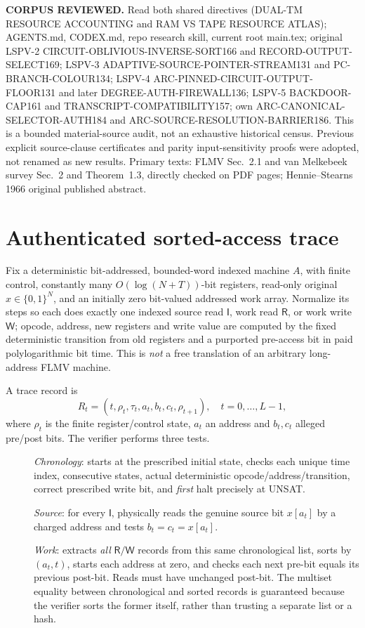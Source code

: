 \documentclass[11pt]{article}
\begin{document}
\noindent\textbf{CORPUS REVIEWED.} Read both shared directives (DUAL-TM RESOURCE ACCOUNTING and RAM VS TAPE RESOURCE ATLAS); AGENTS.md, CODEX.md, repo research skill, current root main.tex; original LSPV-2 CIRCUIT-OBLIVIOUS-INVERSE-SORT166 and RECORD-OUTPUT-SELECT169; LSPV-3 ADAPTIVE-SOURCE-POINTER-STREAM131 and PC-BRANCH-COLOUR134; LSPV-4 ARC-PINNED-CIRCUIT-OUTPUT-FLOOR131 and later DEGREE-AUTH-FIREWALL136; LSPV-5 BACKDOOR-CAP161 and TRANSCRIPT-COMPATIBILITY157; own ARC-CANONICAL-SELECTOR-AUTH184 and ARC-SOURCE-RESOLUTION-BARRIER186. This is a bounded material-source audit, not an exhaustive historical census. Previous explicit source-clause certificates and parity input-sensitivity proofs were adopted, not renamed as new results. Primary texts: FLMV Sec.~2.1 and van Melkebeek survey Sec.~2 and Theorem~1.3, directly checked on PDF pages; Hennie--Stearns 1966 original published abstract.

\section{Authenticated sorted-access trace}
Fix a deterministic bit-addressed, bounded-word indexed machine $A$, with finite control, constantly many $O(\log(N+T))$-bit registers, read-only original $x\in\{0,1\}^N$, and an initially zero bit-valued addressed work array. Normalize its steps so each does exactly one indexed source read $\mathsf I$, work read $\mathsf R$, or work write $\mathsf W$; opcode, address, new registers and write value are computed by the fixed deterministic transition from old registers and a purported pre-access bit in paid polylogarithmic bit time. This is \emph{not} a free translation of an arbitrary long-address FLMV machine.

A trace record is
\[
R_t=(t,\rho_t,\tau_t,a_t,b_t,c_t,\rho_{t+1}),\quad t=0,\ldots,L-1,
\]
where $\rho_t$ is the finite register/control state, $a_t$ an address and $b_t,c_t$ alleged pre/post bits. The verifier performs three tests.
\begin{description}
\item[] \emph{Chronology}: starts at the prescribed initial state, checks each unique time index, consecutive states, actual deterministic opcode/address/transition, correct prescribed write bit, and \emph{first} halt precisely at UNSAT.
\item[] \emph{Source}: for every $\mathsf I$, physically reads the genuine source bit $x[a_t]$ by a charged address and tests $b_t=c_t=x[a_t]$.
\item[] \emph{Work}: extracts \emph{all} $\mathsf R/\mathsf W$ records from this same chronological list, sorts by $(a_t,t)$, starts each address at zero, and checks each next pre-bit equals its previous post-bit. Reads must have unchanged post-bit. The multiset equality between chronological and sorted records is guaranteed because the verifier sorts the former itself, rather than trusting a separate list or a hash.
\end{description}
\end{document}
